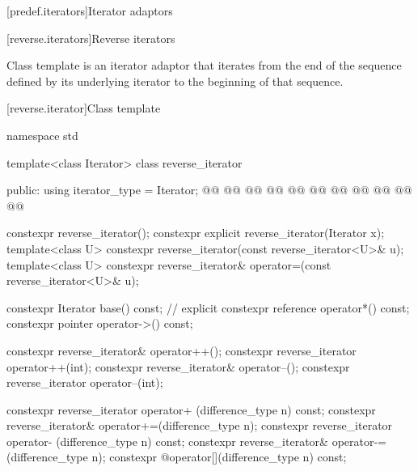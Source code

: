 [predef.iterators]{Iterator adaptors}

[reverse.iterators]{Reverse iterators}

\pnum
Class template  is an iterator adaptor that iterates
from the end of the sequence defined by its underlying iterator to the beginning
of that sequence. 

[reverse.iterator]{Class template }


%
\begin{codeblock}
namespace std {
  template<class Iterator>
  class reverse_iterator {
  public:
    using iterator_type     = Iterator;
    @@
    @@
    @@
    @@
    @@
    @@
    @@
    @@
    @@
    @@
    @@

    constexpr reverse_iterator();
    constexpr explicit reverse_iterator(Iterator x);
    template<class U> constexpr reverse_iterator(const reverse_iterator<U>& u);
    template<class U> constexpr reverse_iterator& operator=(const reverse_iterator<U>& u);

    constexpr Iterator base() const;      // explicit
    constexpr reference operator*() const;
    constexpr pointer   operator->() const;

    constexpr reverse_iterator& operator++();
    constexpr reverse_iterator  operator++(int);
    constexpr reverse_iterator& operator--();
    constexpr reverse_iterator  operator--(int);

    constexpr reverse_iterator  operator+ (difference_type n) const;
    constexpr reverse_iterator& operator+=(difference_type n);
    constexpr reverse_iterator  operator- (difference_type n) const;
    constexpr reverse_iterator& operator-=(difference_type n);
    constexpr @\unspec@ operator[](difference_type n) const;

}}
\end{codeblock}
